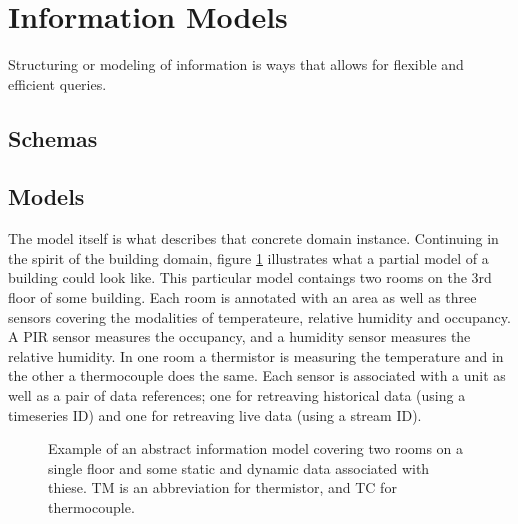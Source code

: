 \section{Information Models}

Structuring or modeling of information is ways that allows for flexible and efficient queries.

\subsection{Schemas}

\subsection{Models}

The model itself is what describes that concrete domain instance. Continuing in the spirit of the building domain, figure \ref{fig:topics:info:model} illustrates what a partial model of a building could look like. This particular model contaings two rooms on the 3rd floor of some building. Each room is annotated with an area as well as three sensors covering the modalities of temperateure, relative humidity and occupancy. A PIR sensor measures the occupancy, and a humidity sensor measures the relative humidity. In one room a thermistor is measuring the temperature and in the other a thermocouple does the same. Each sensor is associated with a unit as well as a pair of data references; one for retreaving historical data (using a timeseries ID) and one for retreaving live data (using a stream ID).

\begin{figure}[tbp]
  \begin{center}
  \end{center}
  \caption[Example of an abstract information model]{Example of an abstract information model covering two rooms on a single floor and some static and dynamic data associated with thiese. TM is an abbreviation for thermistor, and TC for thermocouple.}
  \label{fig:topics:info:model}
\end{figure}

